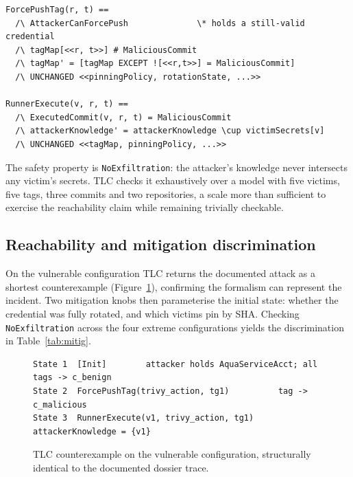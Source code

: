 \documentclass[letterpaper,twocolumn,10pt]{article}
\newcommand{\code}[1]{\texttt{\small #1}}
\begin{document}
\begin{lstlisting}[float=*,caption={The two TLA+ actions. A tag-pinned victim resolves the (possibly mutated) tag; a SHA-pinned victim resolves its audited commit and is immune.},label={lst:actions}]
ForcePushTag(r, t) ==
  /\ AttackerCanForcePush              \* holds a still-valid credential
  /\ tagMap[<<r, t>>] # MaliciousCommit
  /\ tagMap' = [tagMap EXCEPT ![<<r,t>>] = MaliciousCommit]
  /\ UNCHANGED <<pinningPolicy, rotationState, ...>>

RunnerExecute(v, r, t) ==
  /\ ExecutedCommit(v, r, t) = MaliciousCommit
  /\ attackerKnowledge' = attackerKnowledge \cup victimSecrets[v]
  /\ UNCHANGED <<tagMap, pinningPolicy, ...>>
\end{lstlisting}

The safety property is \code{NoExfiltration}: the attacker's knowledge never intersects any victim's secrets. TLC checks it exhaustively over a model with five victims, five tags, three commits and two repositories, a scale more than sufficient to exercise the reachability claim while remaining trivially checkable.

\subsection{Reachability and mitigation discrimination}
On the vulnerable configuration TLC returns the documented attack as a shortest counterexample (Figure~\ref{fig:cex}), confirming the formalism can represent the incident. Two mitigation knobs then parameterise the initial state: whether the credential was fully rotated, and which victims pin by SHA. Checking \code{NoExfiltration} across the four extreme configurations yields the discrimination in Table~\ref{tab:mitig}.

\begin{figure}[t]\centering
\begin{lstlisting}[aboveskip=2pt,belowskip=2pt]
State 1  [Init]        attacker holds AquaServiceAcct; all tags -> c_benign
State 2  ForcePushTag(trivy_action, tg1)          tag -> c_malicious
State 3  RunnerExecute(v1, trivy_action, tg1)     attackerKnowledge = {v1}
\end{lstlisting}
\caption{TLC counterexample on the vulnerable configuration, structurally identical to the documented dossier trace.}\label{fig:cex}
\end{figure}
\end{document}
